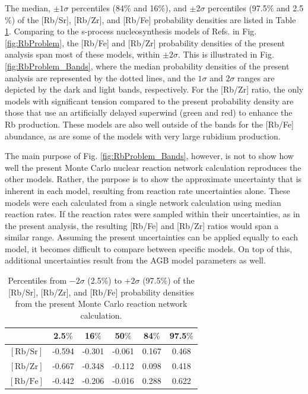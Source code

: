 The median, $\pm 1\sigma$ percentiles (84$\%$ and 16$\%$), and $\pm 2\sigma$ percentiles (97.5$\%$ and 2.5$\%$) of the [Rb/Sr], [Rb/Zr], and [Rb/Fe] probability densities are listed in Table \ref{tab:Prob_Dens}. Comparing to the s-process nucleosynthesis models of Refs. \cite{Karakas2012,Raai2012,Karakas2016,Pignatari2016} in Fig. \ref{fig:RbProblem}, the [Rb/Fe] and [Rb/Zr] probability densities of the present analysis span most of these models, within $\pm 2\sigma$. This is illustrated in Fig. \ref{fig:RbProblem_Bands}, where the median probability densities of the present analysis are represented by the dotted lines, and the $1\sigma$ and $2\sigma$ ranges are depicted by the dark and light bands, respectively. For the [Rb/Zr] ratio, the only models with significant tension compared to the present probability density are those that use an artificially delayed superwind (green and red) to enhance the Rb production. These models are also well outside of the bands for the [Rb/Fe] abundance, as are some of the models with very large rubidium production.

The main purpose of Fig. \ref{fig:RbProblem_Bands}, however, is not to show how well the present Monte Carlo nuclear reaction network calculation reproduces the other models. Rather, the purpose is to show the approximate uncertainty that is inherent in each model, resulting from reaction rate uncertainties alone. These models were each calculated from a single network calculation using median reaction rates. If the reaction rates were sampled within their uncertainties, as in the present analysis, the resulting [Rb/Fe] and [Rb/Zr] ratios would span a similar range. Assuming the present uncertainties can be applied equally to each model, it becomes difficult to compare between specific models. On top of this, additional uncertainties result from the AGB model parameters as well.

\begin{table}[t]
\centering
\caption{\label{tab:Prob_Dens}Percentiles from $-2\sigma$ (2.5$\%$) to $+2\sigma$ (97.5$\%$) of the [Rb/Sr], [Rb/Zr], and [Rb/Fe] probability densities from the present Monte Carlo reaction network calculation.}
\begin{tabular}{cccccc}
\hline\midrule
{}&2.5$\%$&16$\%$&50$\%$&84$\%$&97.5$\%$\\ \midrule
$[\mathrm{Rb}/\mathrm{Sr}]$&-0.594&-0.301&-0.061&0.167&0.468\\
$[\mathrm{Rb}/\mathrm{Zr}]$&-0.667&-0.348&-0.112&0.098&0.418\\
$[\mathrm{Rb}/\mathrm{Fe}]$&-0.442&-0.206&-0.016&0.288&0.622\\
\hline\hline
\end{tabular}
\end{table}

